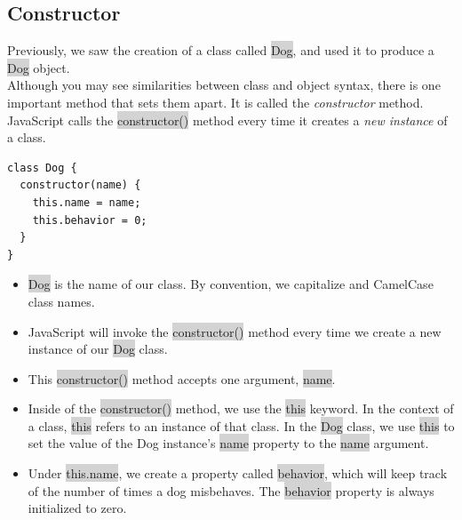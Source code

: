 \documentclass[11pt]{article}
\begin{document}
\subsection{Constructor}
Previously, we saw the creation of a class called \colorbox{lightgray}{Dog}, and used it to produce a \colorbox{lightgray}{Dog} object. \\
\newline
Although you may see similarities between class and object syntax, there is one important method that sets them apart. It is called the \textit{constructor} method. JavaScript calls the \colorbox{lightgray}{constructor()} method every time it creates a \textit{new instance} of a class. 
\begin{lstlisting}
class Dog {
  constructor(name) {
    this.name = name;
    this.behavior = 0;
  }
}
\end{lstlisting}
\begin{itemize}[leftmargin = *]
\item \colorbox{lightgray}{Dog} is the name of our class. By convention, we capitalize and CamelCase class names.
\item JavaScript will invoke the \colorbox{lightgray}{constructor()} method every time we create a new instance of our \colorbox{lightgray}{Dog} class.
\item This \colorbox{lightgray}{constructor()} method accepts one argument, \colorbox{lightgray}{name}.
\item Inside of the \colorbox{lightgray}{constructor()} method, we use the \colorbox{lightgray}{this} keyword. In the context of a class, \colorbox{lightgray}{this} refers to an instance of that class. In the \colorbox{lightgray}{Dog} class, we use \colorbox{lightgray}{this} to set the value of the Dog instance’s \colorbox{lightgray}{name} property to the \colorbox{lightgray}{name} argument.
\item Under \colorbox{lightgray}{this.name}, we create a property called \colorbox{lightgray}{behavior}, which will keep track of the number of times a dog misbehaves. The \colorbox{lightgray}{behavior} property is always initialized to zero.
\end{itemize}
\end{document}
